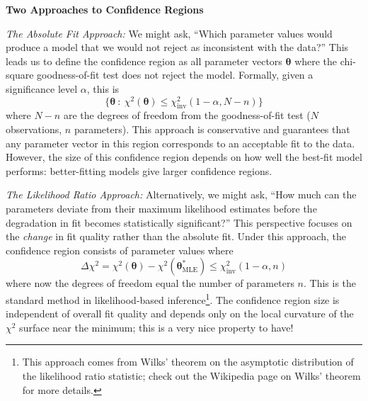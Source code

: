 \begin{definitionBox}
\textbf{Two Approaches to Confidence Regions}

\textit{The Absolute Fit Approach:} We might ask, ``Which parameter values would produce a model that we would not reject as inconsistent with the data?'' This leads us to define the confidence region as all parameter vectors $\boldsymbol{\theta}$ where the chi-square goodness-of-fit test does not reject the model. Formally, given a significance level $\alpha$, this is
\begin{equation}
    \{\boldsymbol{\theta} \ : \ \chi^2(\boldsymbol{\theta}) \leq \chi^2_{\text{inv}}(1-\alpha, N-n)\}
\end{equation}
where $N-n$ are the degrees of freedom from the goodness-of-fit test ($N$ observations, $n$ parameters). This approach is conservative and guarantees that any parameter vector in this region corresponds to an acceptable fit to the data. However, the size of this confidence region depends on how well the best-fit model performs: better-fitting models give larger confidence regions.

\textit{The Likelihood Ratio Approach:} Alternatively, we might ask, ``How much can the parameters deviate from their maximum likelihood estimates before the degradation in fit becomes statistically significant?'' This perspective focuses on the \textit{change} in fit quality rather than the absolute fit. Under this approach, the confidence region consists of parameter values where
\begin{equation}
    \Delta\chi^2 = \chi^2(\boldsymbol{\theta}) - \chi^2(\boldsymbol{\theta}^*_{\text{MLE}}) \leq \chi^2_{\text{inv}}(1-\alpha, n)
\end{equation}
where now the degrees of freedom equal the number of parameters $n$. This is the standard method in likelihood-based inference\footnote{This approach comes from Wilks' theorem on the asymptotic distribution of the likelihood ratio statistic; check out the Wikipedia page on Wilks' theorem for more details.}. The confidence region size is independent of overall fit quality and depends only on the local curvature of the $\chi^2$ surface near the minimum; this is a very nice property to have!

\vspace{0.2cm}


\end{definitionBox}
